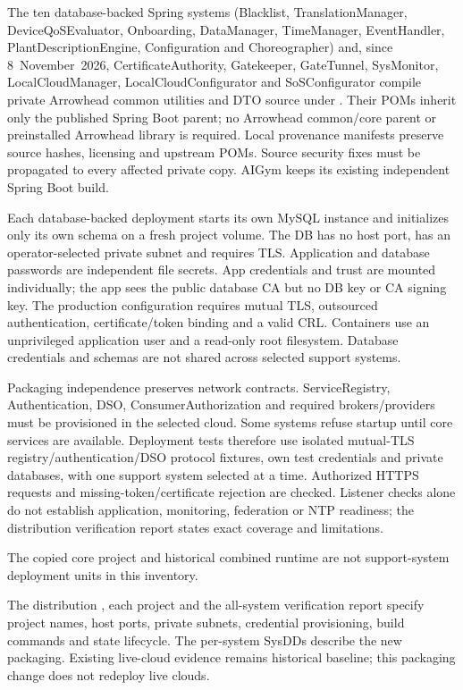 \documentclass[a4paper]{arrowhead}
\begin{document}
The ten database-backed Spring systems (Blacklist, TranslationManager, DeviceQoSEvaluator, Onboarding, DataManager, TimeManager, EventHandler, PlantDescriptionEngine, Configuration and Choreographer) and, since 8~November~2026, CertificateAuthority, Gatekeeper, GateTunnel, SysMonitor, LocalCloudManager, LocalCloudConfigurator and SoSConfigurator compile private Arrowhead common utilities and DTO source under . Their POMs inherit only the published Spring Boot parent; no Arrowhead common/core parent or preinstalled Arrowhead library is required. Local provenance manifests preserve source hashes, licensing and upstream POMs. Source security fixes must be propagated to every affected private copy. AIGym keeps its existing independent Spring Boot build.

Each database-backed deployment starts its own MySQL instance and initializes only its own schema on a fresh project volume. The DB has no host port, has an operator-selected private subnet and requires TLS. Application and database passwords are independent file secrets. App credentials and trust are mounted individually; the app sees the public database CA but no DB key or CA signing key. The production configuration requires mutual TLS, outsourced authentication, certificate/token binding and a valid CRL. Containers use an unprivileged application user and a read-only root filesystem. Database credentials and schemas are not shared across selected support systems.

Packaging independence preserves network contracts. ServiceRegistry, Authentication, DSO, ConsumerAuthorization and required brokers/providers must be provisioned in the selected cloud. Some systems refuse startup until core services are available. Deployment tests therefore use isolated mutual-TLS registry/authentication/DSO protocol fixtures, own test credentials and private databases, with one support system selected at a time. Authorized HTTPS requests and missing-token/certificate rejection are checked. Listener checks alone do not establish application, monitoring, federation or NTP readiness; the distribution verification report states exact coverage and limitations.

The copied core project and historical combined runtime are not support-system deployment units in this inventory.

The distribution , each project  and the all-system verification report specify project names, host ports, private subnets, credential provisioning, build commands and state lifecycle. The per-system SysDDs describe the new packaging. Existing live-cloud evidence remains historical baseline; this packaging change does not redeploy live clouds.
\end{document}
